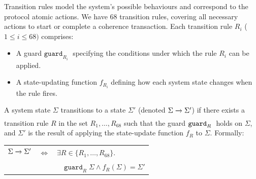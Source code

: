 \documentclass[10pt,conference]{IEEEtran}
\newcommand{\StateSymbol}{\Sigma}
\newcommand{\makestep}[2]{%
  \xrightarrow[%
    {\mathclap{\scriptscriptstyle
      \ifstrempty{#2}{}{#2}
    }}%
  ]{%
    {\mathclap{\scriptscriptstyle
      \ifstrempty{#1}{}{#1}
    }}%
  }%
}
\newcommand\field[1]{\textsf{#1}}
\begin{document}


\newcommand{\ReqChannels}{\texttt{ReqChannels}}
\newcommand{\RespChannels}{\texttt{RespChannels}}
\newcommand{\DataChannels}{\texttt{DataChannels}}
\newcommand{\Cachelines}{\texttt{Cachelines}}
\newcommand\Aux{\texttt{AuxStates}}
\newcommand\guard[2]{\texttt{guard}_{#1}\;#2}
\newcommand{\Transitions}{\texttt{Transitions}}
\newcommand\dn{\stackrel{\mathit{def}}{=}}
\newcommand\Channels{\texttt{Channels}}



Transition rules model the system's possible behaviours and correspond to the protocol atomic actions.
%
We have 68 transition rules, covering all necessary actions to start or complete a coherence transaction.
%
Each transition rule $R_i$ ($1\leq i \leq 68)$ comprises: 
\begin{itemize}
    \item A guard $\guard{R_i}{}$ specifying the conditions under which the rule $R_i$ can be applied.
    \item A state-updating function $f_{R_i}$ defining how each system state changes when the rule fires.
\end{itemize}
\noindent A system state $\StateSymbol{}$ transitions to a state $\StateSymbol{}'$ (denoted $\StateSymbol{} \makestep{}{} \StateSymbol{}'$) if there exists a transition rule $R$ in the set ${R_1, \ldots, R_{68}}$ such that the guard $\guard{R}$ holds on $\StateSymbol{}$, and $\StateSymbol{}'$ is the result of applying the state-update function $f_R$ to $\StateSymbol{}$. Formally:
\begin{center}
  \begin{tabular}{lcl}
$\StateSymbol{} \makestep{}{} \StateSymbol{}'$ & $\iff$ & $\exists R \in \{R_1, \ldots, R_{68}\}.$ \\
& & $\quad \guard{R}{\StateSymbol{}} \land f_R(\StateSymbol{}) = \StateSymbol{}'$
  \end{tabular}
\end{center}
\end{document}
